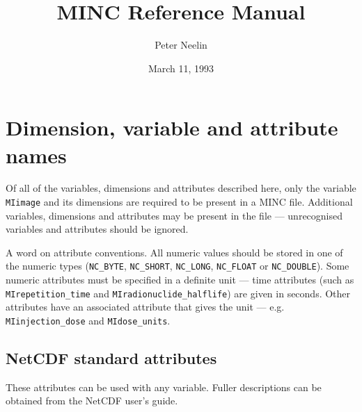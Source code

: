 \title{MINC Reference Manual}
\author{Peter Neelin}
\date{March 11, 1993}
\textwidth 6.0in
\oddsidemargin 0.125in
\textheight 8.5in
\topmargin -0.75in
\parindent 0in



\def\code#1{{\tt #1}}

\maketitle

\section{Dimension, variable and attribute names}

Of all of the variables, dimensions and attributes described here, only
the variable \code{MIimage} and its dimensions are required to be
present in a MINC file. Additional variables, dimensions and
attributes may be present in the file --- unrecognised variables and
attributes should be ignored.

A word on attribute conventions. All numeric values should be stored
in one of the numeric types (\code{NC\_BYTE}, \code{NC\_SHORT},
\code{NC\_LONG}, \code{NC\_FLOAT} or \code{NC\_DOUBLE}). Some numeric
attributes must be specified in a definite unit --- time attributes
(such as \code{MIrepetition\_time} and \code{MIradionuclide\_halflife}) 
are given in seconds. Other attributes have an associated attribute that
gives the unit --- e.g. \code{MIinjection\_dose} and \code{MIdose\_units}.

\subsection{NetCDF standard attributes}

These attributes can be used with any variable. Fuller descriptions
can be obtained from the NetCDF user's guide.

